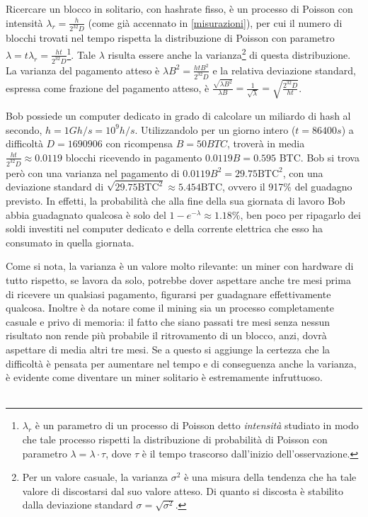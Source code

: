 Ricercare un blocco in solitario, con hashrate fisso, è un processo di Poisson con intensità $\lambda_r = \frac{h}{2^{32}D}$ (come già accennato in \ref{misurazioni}), per cui il numero di blocchi trovati nel tempo rispetta la distribuzione di Poisson con parametro $\lambda = t\lambda_r = \frac{ht}{2^{32}D}$\footnote{$\lambda_r$ è un parametro di un processo di Poisson detto \emph{intensità} studiato in modo che tale processo rispetti la distribuzione di probabilità di Poisson con parametro $\lambda = \lambda \cdot \tau$, dove $\tau$ è il tempo trascorso dall'inizio dell'osservazione.}.
Tale $\lambda$ risulta essere anche la varianza\footnote{Per un valore casuale, la varianza $\sigma^2$ è una misura della tendenza che ha tale valore di discostarsi dal suo valore atteso. Di quanto si discosta è stabilito dalla deviazione standard $\sigma = \sqrt{\sigma^2}$.} di questa distribuzione. La varianza del pagamento atteso è $\lambda B^2 = \frac{htB^2}{2^{32}D}$ e la relativa deviazione standard, espressa come frazione del pagamento atteso, è $\frac{\sqrt{\lambda B^2}}{\lambda B} = \frac{1}{\sqrt{\lambda}} = \sqrt{\frac{2^{32}D}{ht}}$.

\begin{esempio}
Bob possiede un computer dedicato in grado di calcolare un miliardo di hash al secondo, $h = 1Gh/s = 10^9 h/s$. Utilizzandolo per un giorno intero ($t = 86400s$) a difficoltà $D = 1690906$ con ricompensa $B = 50BTC$, troverà in media $\frac{ht}{2^{32}D} \approx 0.0119$ blocchi ricevendo in pagamento $0.0119B = 0.595$ BTC.
Bob si trova però con una varianza nel pagamento di $0.0119B^2 = 29.75 \text{BTC}^2$, con una deviazione standard di $\sqrt{29.75 \text{BTC}^2} \approx 5.454 \text{BTC}$, ovvero il 917\% del guadagno previsto. In effetti, la probabilità che alla fine della sua giornata di lavoro Bob abbia guadagnato qualcosa è solo del $1 - e^{-\lambda} \approx 1.18\%$, ben poco per ripagarlo dei soldi investiti nel computer dedicato e della corrente elettrica che esso ha consumato in quella giornata.
\end{esempio}

Come si nota, la varianza è un valore molto rilevante: un miner con hardware di tutto rispetto, se lavora da solo, potrebbe dover aspettare anche tre mesi prima di ricevere un qualsiasi pagamento, figurarsi per guadagnare effettivamente qualcosa. Inoltre è da notare come il mining sia un processo completamente casuale e privo di memoria: il fatto che siano passati tre mesi senza nessun risultato non rende più probabile il ritrovamento di un blocco, anzi, dovrà aspettare di media altri tre mesi. Se a questo si aggiunge la certezza che la difficoltà è pensata per aumentare nel tempo e di conseguenza anche la varianza, è evidente come diventare un miner solitario è estremamente infruttuoso. \\\\

